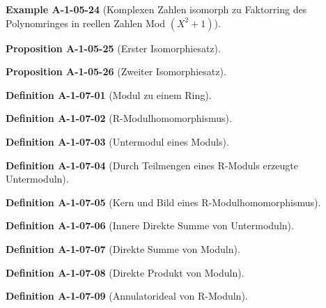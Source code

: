 \documentclass[10pt, letterpaper]{article}
\newcommand{\CustomHeading}[3]{%
  \par\medskip\noindent%
  \textbf{#1 #2} \textnormal{(#3)}.\enskip%
}
\newenvironment{DEF}[2]{\CustomHeading{Definition}{#1}{#2}}{}
\newenvironment{PROP}[2]{\CustomHeading{Proposition}{#1}{#2}}{}
\newenvironment{EXA}[2]{\CustomHeading{Example}{#1}{#2}}{}
\begin{document}
\begin{EXA}{A-1-05-24}{Komplexen Zahlen isomorph zu Faktorring des Polynomringes in reellen Zahlen Mod $(X^2+1)$}
\end{EXA}

\begin{PROP}{A-1-05-25}{Erster Isomorphiesatz}
\end{PROP}

\begin{PROP}{A-1-05-26}{Zweiter Isomorphiesatz}
\end{PROP}

\begin{DEF}{A-1-07-01}{Modul zu einem Ring}
\end{DEF}

\begin{DEF}{A-1-07-02}{R-Modulhomomorphismus}
\end{DEF}

\begin{DEF}{A-1-07-03}{Untermodul eines Moduls}
\end{DEF}

\begin{DEF}{A-1-07-04}{Durch Teilmengen eines R-Moduls erzeugte Untermoduln}
\end{DEF}

\begin{DEF}{A-1-07-05}{Kern und Bild eines R-Modulhomomorphismus}
\end{DEF}

\begin{DEF}{A-1-07-06}{Innere Direkte Summe von Untermoduln}
\end{DEF}

\begin{DEF}{A-1-07-07}{Direkte Summe von Moduln}
\end{DEF}

\begin{DEF}{A-1-07-08}{Direkte Produkt von Moduln}
\end{DEF}

\begin{DEF}{A-1-07-09}{Annulatorideal von R-Moduln}
\end{DEF}
\end{document}
